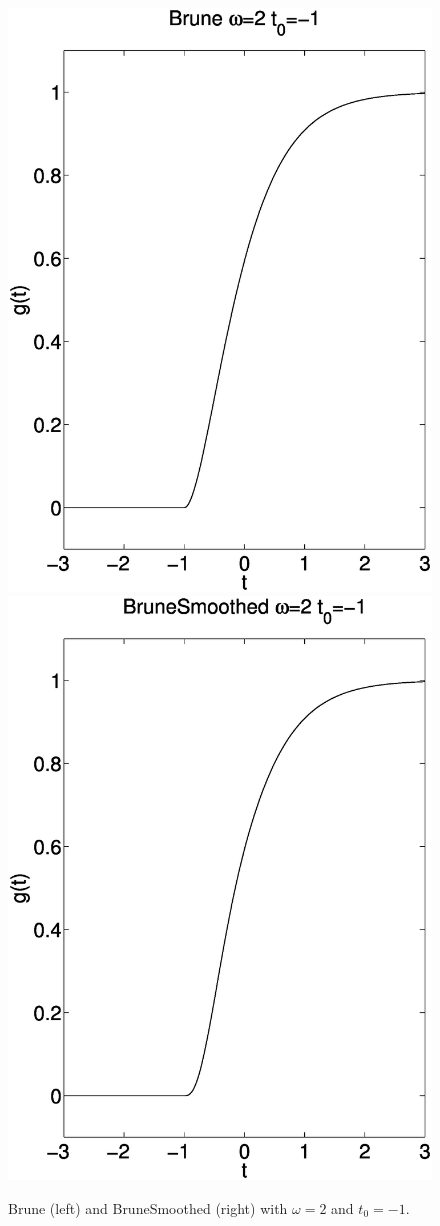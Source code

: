 \documentclass[11pt]{report}
\begin{document}
\begin{figure}
\begin{centering}
  \includegraphics[width=0.4\linewidth]{f9-brune.ps}
  \includegraphics[width=0.4\linewidth]{f10-brunesmoothed.ps}
  \caption{Brune (left) and BruneSmoothed (right) with $\omega=2$ and $t_0=-1$.}
  \label{fig:brunes}
\end{centering}
\end{figure}  
\end{document}
